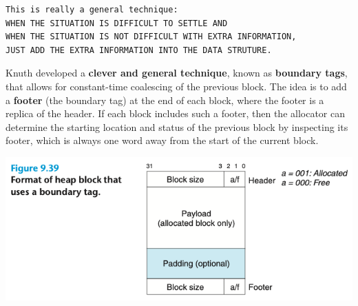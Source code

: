 \documentclass[11pt]{article}
\begin{document}
\begin{verbatim}
This is really a general technique:
WHEN THE SITUATION IS DIFFICULT TO SETTLE AND 
WHEN THE SITUATION IS NOT DIFFICULT WITH EXTRA INFORMATION,
JUST ADD THE EXTRA INFORMATION INTO THE DATA STRUTURE.
\end{verbatim}

Knuth developed a \textbf{clever and general technique}, known as \textbf{boundary tags}, that allows for constant-time coalescing of the previous block. The idea is to add a \textbf{footer} (the boundary tag) at the end of each block, where the footer is a replica of the header. If each block includes such a footer, then the allocator can determine the starting location and status of the previous block by inspecting its footer, which is always one word away from the start of the current block.\\

\begin{center}
\includegraphics[width=.9\linewidth]{pics/figure9.39-footer.png}
\end{center}
\end{document}
